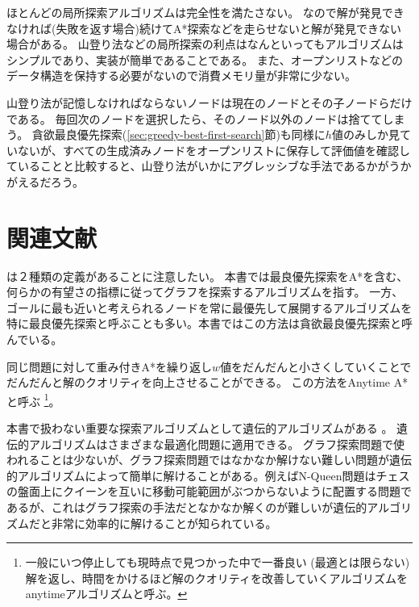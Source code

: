 ほとんどの局所探索アルゴリズムは完全性を満たさない。
なので解が発見できなければ(失敗を返す場合)続けてA*探索などを走らせないと解が発見できない場合がある。
山登り法などの局所探索の利点はなんといってもアルゴリズムはシンプルであり、実装が簡単であることである。
また、オープンリストなどのデータ構造を保持する必要がないので消費メモリ量が非常に少ない。

山登り法が記憶しなければならないノードは現在のノードとその子ノードらだけである。
毎回次のノードを選択したら、そのノード以外のノードは捨ててしまう。
貪欲最良優先探索(\ref{sec:greedy-best-first-search}節)も同様に$h$値のみしか見ていないが、すべての生成済みノードをオープンリストに保存して評価値を確認していることと比較すると、山登り法がいかにアグレッシブな手法であるかがうかがえるだろう。



\section{関連文献}

は２種類の定義があることに注意したい。
本書では最良優先探索をA*を含む、何らかの有望さの指標に従ってグラフを探索するアルゴリズムを指す。
一方、ゴールに最も近いと考えられるノードを常に最優先して展開するアルゴリズムを特に最良優先探索と呼ぶことも多い。本書ではこの方法は貪欲最良優先探索と呼んでいる。

同じ問題に対して重み付きA*を繰り返し$w$値をだんだんと小さくしていくことでだんだんと解のクオリティを向上させることができる。
この方法をAnytime A*と呼ぶ \cite{likhachev2004ara} \footnote{一般にいつ停止しても現時点で見つかった中で一番良い (最適とは限らない)解を返し、時間をかけるほど解のクオリティを改善していくアルゴリズムをanytimeアルゴリズムと呼ぶ。}。

本書で扱わない重要な探索アルゴリズムとして遺伝的アルゴリズムがある \cite{goldberg1989}。
遺伝的アルゴリズムはさまざまな最適化問題に適用できる。
グラフ探索問題で使われることは少ないが、グラフ探索問題ではなかなか解けない難しい問題が遺伝的アルゴリズムによって簡単に解けることがある。例えばN-Queen問題はチェスの盤面上にクイーンを互いに移動可能範囲がぶつからないように配置する問題であるが、これはグラフ探索の手法だとなかなか解くのが難しいが遺伝的アルゴリズムだと非常に効率的に解けることが知られている。
